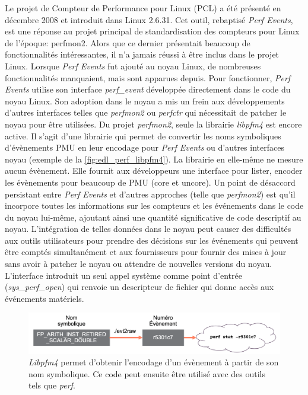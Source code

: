            Le projet de Compteur de Performance pour Linux (PCL) a été présenté en décembre 2008 et introduit dans Linux 2.6.31. Cet outil, rebaptisé \textit{Perf Events}, est une réponse au projet principal de standardisation des compteurs pour Linux de l'époque: perfmon2. Alors que ce dernier présentait beaucoup de fonctionnalités intéressantes, il n'a jamais réussi à être inclus dans le projet Linux. Lorsque \textit{Perf Events} fut ajouté au noyau Linux, de nombreuses fonctionnalités manquaient, mais sont apparues depuis. Pour fonctionner, \textit{Perf Events} utilise son interface \textit{perf\_event} développée directement dans le code du noyau Linux. Son adoption dans le noyau a mis un frein aux développements d'autres interfaces telles que \textit{perfmon2} ou \textit{perfctr} qui nécessitait de patcher le noyau pour être utilisées.  Du projet \textit{perfmon2}, seule la librairie \textit{libpfm4} est encore active. Il s'agit d'une librairie qui permet de convertir les noms symboliques d'évènements PMU en leur encodage pour \textit{Perf Events} ou d'autres interfaces noyau (exemple de la \autoref{fig:edl_perf_libpfm4}). La librairie en elle-même ne mesure aucun évènement. Elle fournit aux développeurs une interface pour lister, encoder les évènements pour beaucoup de PMU (core et uncore). Un point de désaccord persistant entre \textit{Perf Events} et d'autres approches (telle que \textit{perfmon2}) est qu'il incorpore toutes les informations sur les compteurs et les événements dans le code du noyau lui-même, ajoutant ainsi une quantité significative de code descriptif au noyau. L'intégration de telles données dans le noyau peut causer des difficultés aux outils utilisateurs pour prendre des décisions sur les événements qui peuvent être comptés simultanément et aux fournisseurs pour fournir des mises à jour sans avoir à patcher le noyau ou attendre de nouvelles versions du noyau. L'interface introduit un seul appel système comme point d'entrée (\textit{sys\_perf\_open}) qui renvoie un descripteur de fichier qui donne accès aux événements matériels. 
            
            \begin{figure}[ht!]
            \center
            \includegraphics[width=14cm]{images/edl_perf_libpfm4.png}
            \caption{\label{fig:edl_perf_libpfm4} \textit{Libpfm4} permet d'obtenir l'encodage d'un évènement à partir de son nom symbolique. Ce code peut ensuite être utilisé avec des outils tels que \textit{perf}.}
            \end{figure}
 
